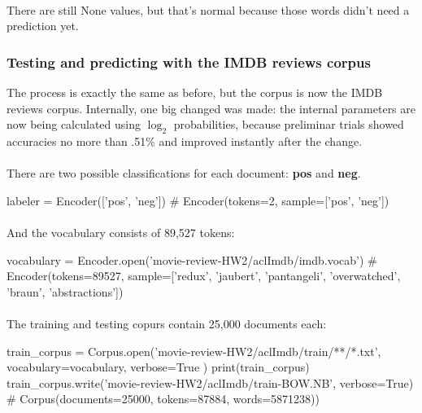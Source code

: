 \documentclass{article}
\begin{document}
\paragraph{} There are still None values, but that's normal because those words didn't need a prediction yet.

\clearpage

\subsubsection*{Testing and predicting with the IMDB reviews corpus}

The process is exactly the same as before, but the corpus is now the IMDB reviews corpus. Internally, one big changed was made: the internal parameters are now being calculated using \(\log_2\) probabilities, because preliminar trials showed accuracies no more than .51\% and improved instantly after the change.

\paragraph{} There are two possible classifications for each document: \textbf{pos} and \textbf{neg}.
\begin{python}
labeler = Encoder(['pos', 'neg'])
# Encoder(tokens=2, sample=['pos', 'neg'])
\end{python}

\paragraph{} And the vocabulary consists of 89,527 tokens:

\begin{python}
vocabulary = Encoder.open('movie-review-HW2/aclImdb/imdb.vocab')
# Encoder(tokens=89527, sample=['redux', 'jaubert', 'pantangeli', 'overwatched', 'braun', 'abstractions'])
\end{python}

\paragraph{} The training and testing copurs contain 25,000 documents each:

\begin{python}
    train_corpus = Corpus.open('movie-review-HW2/aclImdb/train/**/*.txt',
    vocabulary=vocabulary,
    verbose=True
)
print(train_corpus)
train_corpus.write('movie-review-HW2/aclImdb/train-BOW.NB', verbose=True)
# Corpus(documents=25000, tokens=87884, words=5871238))
\end{python}
\end{document}

